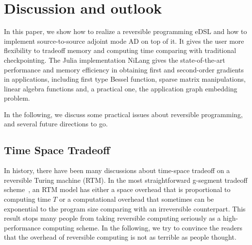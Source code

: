 \documentclass{article}
\newcommand{\<}{\langle}
\renewcommand{\>}{\rangle}
\theoremstyle{definition}\newtheorem{definition}{\textit{Definition}}
\begin{document}
\section{Discussion and outlook}\label{sec:discussion}
In this paper, we show how to realize a reversible programming eDSL and how to implement source-to-source adjoint mode AD on top of it.
It gives the user more flexibility to tradeoff memory and computing time comparing with traditional checkpointing.
The Julia implementation NiLang gives the state-of-the-art performance and memory efficiency in obtaining first and second-order gradients in applications, including first type Bessel function, sparse matrix manipulations, linear algebra functions and, a practical one, the application graph embedding problem.

In the following, we discuss some practical issues about reversible programming, and several future directions to go.

\subsection{Time Space Tradeoff}\label{sec:timespace}
In history, there have been many discussions about time-space tradeoff on a reversible Turing machine (RTM).
In the most straightforward g-segment tradeoff scheme~\cite{Bennett1989,Levine1990}, an RTM model has either a space overhead that is proportional to computing time $T$ or a computational overhead that sometimes can be exponential to the program size comparing with an irreversible counterpart.
This result stops many people from taking reversible computing seriously as a high-performance computing scheme.
In the following, we try to convince the readers that the overhead of reversible computing is not as terrible as people thought.
\end{document}
